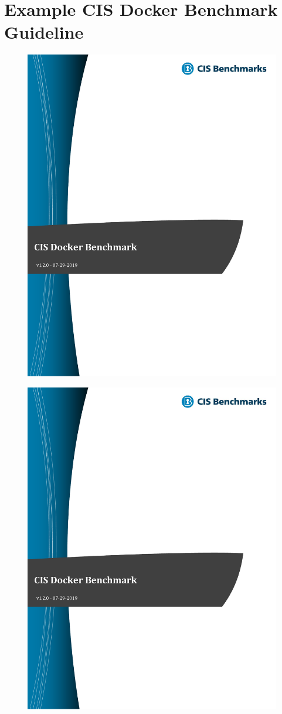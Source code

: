 \chapter{Example CIS Docker Benchmark Guideline}\label{appendix:CIS-Benchmark-Example}
\begin{figure}[ht]
    \centering
    \includegraphics[page=135,width=.8\linewidth]{resources/images/cis_docker_benchmarks.pdf}
\end{figure}

\pagebreak

\begin{figure}[ht]
    \centering
    \includegraphics[page=136,width=.8\textwidth]{resources/images/cis_docker_benchmarks.pdf}
\end{figure}

